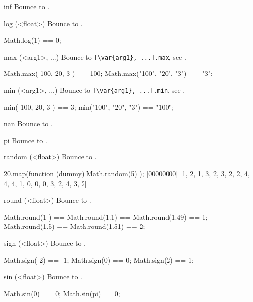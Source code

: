 \begin{urbiscriptapi}
\item[inf]
  Bounce to .

\item[log](<float>)%
  Bounce to .
\begin{urbiassert}
Math.log(1) == 0;
\end{urbiassert}

\item[max](<arg1>, ...)%
  Bounce to \lstinline|[\var{arg1}, ...].max|, see .
\begin{urbiassert}
Math.max( 100,   20,   3 ) == 100;
Math.max("100", "20", "3") == "3";
\end{urbiassert}

\item[min](<arg1>, ...)%
  Bounce to \lstinline|[\var{arg1}, ...].min|, see .
\begin{urbiassert}
min( 100,   20,   3 ) ==     3;
min("100", "20", "3") == "100";
\end{urbiassert}

\item[nan]
  Bounce to .

\item[pi]
  Bounce to .

\item[random](<float>)%
  Bounce to .
\begin{urbiscript}
20.map(function (dummy) { Math.random(5) });
[00000000] [1, 2, 1, 3, 2, 3, 2, 2, 4, 4, 4, 1, 0, 0, 0, 3, 2, 4, 3, 2]
\end{urbiscript}

\item[round](<float>)%
  Bounce to .
\begin{urbiassert}
Math.round(1  ) == Math.round(1.1)  == Math.round(1.49) == 1;
Math.round(1.5) == Math.round(1.51) == 2;
\end{urbiassert}

\item[sign](<float>)%
  Bounce to .
\begin{urbiassert}
Math.sign(-2) == -1;  Math.sign(0)  == 0;  Math.sign(2)  == 1;
\end{urbiassert}

\item[sin](<float>)%
  Bounce to .
\begin{urbiassert}
Math.sin(0) == 0;
Math.sin(pi) ~= 0;
\end{urbiassert}


\end{urbiscriptapi}
